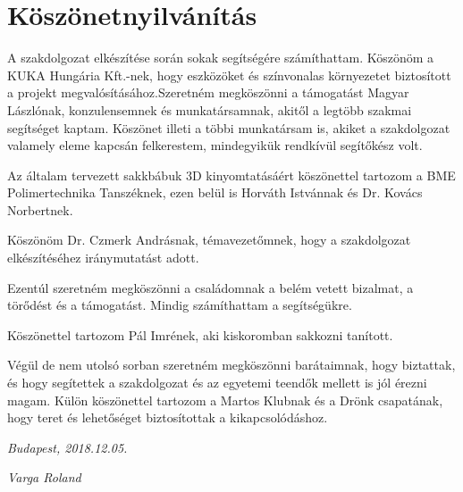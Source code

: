 \documentclass[../documentation.tex]{subfiles}
\begin{document}
 \section{Köszönetnyilvánítás}
 A szakdolgozat elkészítése során sokak segítségére számíthattam. Köszönöm a KUKA Hungária Kft.-nek, hogy eszközöket és színvonalas környezetet biztosított a projekt megvalósításához.Szeretném megköszönni a támogatást Magyar Lászlónak, konzulensemnek és munkatársamnak, akitől a legtöbb szakmai segítséget kaptam. Köszönet illeti a többi munkatársam is, akiket a szakdolgozat valamely eleme kapcsán felkerestem, mindegyikük rendkívül segítőkész volt.

Az általam tervezett sakkbábuk 3D kinyomtatásáért köszönettel tartozom a BME Polimertechnika Tanszéknek, ezen belül is Horváth Istvánnak és Dr. Kovács Norbertnek.

Köszönöm Dr. Czmerk Andrásnak, témavezetőmnek, hogy a szakdolgozat elkészítéséhez iránymutatást adott.

Ezentúl szeretném megköszönni a családomnak a belém vetett bizalmat, a törődést és a támogatást. Mindig számíthattam a segítségükre.

Köszönettel tartozom Pál Imrének, aki kiskoromban sakkozni tanított.

Végül de nem utolsó sorban szeretném megköszönni barátaimnak, hogy biztattak, és hogy segítettek a szakdolgozat és az egyetemi teendők mellett is jól érezni magam. Külön köszönettel tartozom a Martos Klubnak és a Drönk csapatának, hogy teret és lehetőséget biztosítottak a kikapcsolódáshoz.

\vspace{10mm}
\itshape{Budapest, 2018.12.05.}

\vspace{7mm}
\hspace{80mm} \itshape{Varga Roland}
\end{document}

